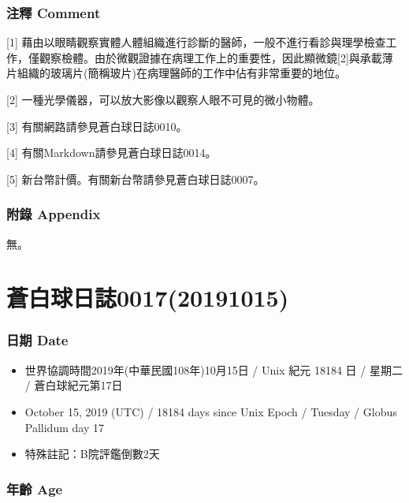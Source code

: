 \documentclass[a5paper, 12pt
]{book}
\providecommand{\tightlist}{%
  \setlength{\itemsep}{0pt}\setlength{\parskip}{0pt}}
\begin{document}
\hypertarget{ux6ce8ux91cb-comment-9}{%
\subsubsection{注釋 Comment}\label{ux6ce8ux91cb-comment-9}}

{[}1{]}
藉由以眼睛觀察實體人體組織進行診斷的醫師，一般不進行看診與理學檢查工作，僅觀察檢體。由於微觀證據在病理工作上的重要性，因此顯微鏡{[}2{]}與承載薄片組織的玻璃片(簡稱玻片)在病理醫師的工作中佔有非常重要的地位。

{[}2{]} 一種光學儀器，可以放大影像以觀察人眼不可見的微小物體。

{[}3{]} 有關網路請參見蒼白球日誌0010。

{[}4{]} 有關Markdown請參見蒼白球日誌0014。

{[}5{]} 新台幣計價。有關新台幣請參見蒼白球日誌0007。

\hypertarget{ux9644ux9304-appendix-8}{%
\subsubsection{附錄 Appendix}\label{ux9644ux9304-appendix-8}}

無。

\hypertarget{ux84bcux767dux7403ux65e5ux8a8c001720191015}{%
\section{蒼白球日誌0017(20191015)}\label{ux84bcux767dux7403ux65e5ux8a8c001720191015}}

\hypertarget{ux65e5ux671f-date-16}{%
\subsubsection{日期 Date}\label{ux65e5ux671f-date-16}}

\begin{itemize}
\tightlist
\item
  世界協調時間2019年(中華民國108年)10月15日 / Unix 紀元 18184 日 /
  星期二 / 蒼白球紀元第17日
\item
  October 15, 2019 (UTC) / 18184 days since Unix Epoch / Tuesday /
  Globus Pallidum day 17
\item
  特殊註記：B院評鑑倒數2天
\end{itemize}

\hypertarget{ux5e74ux9f61-age-16}{%
\subsubsection{年齡 Age}\label{ux5e74ux9f61-age-16}}
\end{document}
